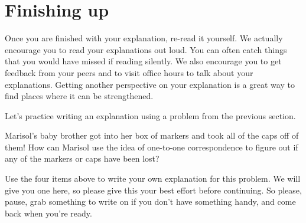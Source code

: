 \documentclass[noauthor,nooutcomes]{ximera}
\begin{document}
\section{Finishing up}
Once you are finished with your explanation, re-read it yourself. We actually encourage you to read your explanations out loud. You can often catch things that you would have missed if reading silently. We also encourage you to get feedback from your peers and to visit office hours to talk about your explanations. Getting another perspective on your explanation is a great way to find places where it can be strengthened.


Let's practice writing an explanation using a problem from the previous section.



\begin{problem}
Marisol's baby brother got into her box of markers and took all of the caps off of them! How can Marisol  use the idea of one-to-one correspondence to figure out if any of the markers or caps have been lost?

\begin{prompt} %
Use the four items above to write your own explanation for this problem. We will give you one here, so please give this your best effort before continuing. So please, pause, grab something to write on if you don't have something handy, and come back when you're ready.

\begin{multipleChoice}
\end{multipleChoice}
\end{prompt}




\end{problem}
\end{document}
